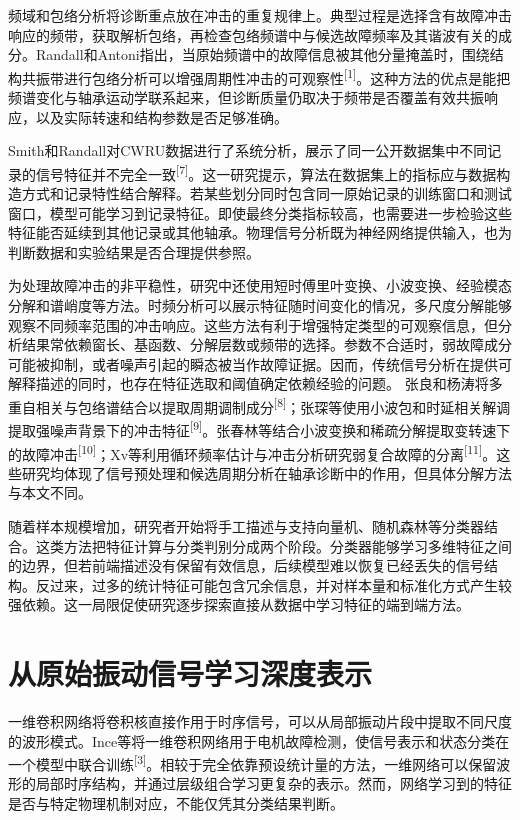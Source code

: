\documentclass[UTF8,12pt,openany,twoside]{ctexbook}
\numberwithin{equation}{chapter}
\begin{document}
频域和包络分析将诊断重点放在冲击的重复规律上。典型过程是选择含有故障冲击响应的频带，获取解析包络，再检查包络频谱中与候选故障频率及其谐波有关的成分。Randall和Antoni指出，当原始频谱中的故障信息被其他分量掩盖时，围绕结构共振带进行包络分析可以增强周期性冲击的可观察性\textsuperscript{[1]}。这种方法的优点是能把频谱变化与轴承运动学联系起来，但诊断质量仍取决于频带是否覆盖有效共振响应，以及实际转速和结构参数是否足够准确。

Smith和Randall对CWRU数据进行了系统分析，展示了同一公开数据集中不同记录的信号特征并不完全一致\textsuperscript{[7]}。这一研究提示，算法在数据集上的指标应与数据构造方式和记录特性结合解释。若某些划分同时包含同一原始记录的训练窗口和测试窗口，模型可能学习到记录特征。即使最终分类指标较高，也需要进一步检验这些特征能否延续到其他记录或其他轴承。物理信号分析既为神经网络提供输入，也为判断数据和实验结果是否合理提供参照。

为处理故障冲击的非平稳性，研究中还使用短时傅里叶变换、小波变换、经验模态分解和谱峭度等方法。时频分析可以展示特征随时间变化的情况，多尺度分解能够观察不同频率范围的冲击响应。这些方法有利于增强特定类型的可观察信息，但分析结果常依赖窗长、基函数、分解层数或频带的选择。参数不合适时，弱故障成分可能被抑制，或者噪声引起的瞬态被当作故障证据。因而，传统信号分析在提供可解释描述的同时，也存在特征选取和阈值确定依赖经验的问题。 张良和杨涛将多重自相关与包络谱结合以提取周期调制成分\textsuperscript{[8]}；张琛等使用小波包和时延相关解调提取强噪声背景下的冲击特征\textsuperscript{[9]}。张春林等结合小波变换和稀疏分解提取变转速下的故障冲击\textsuperscript{[10]}；Xv等利用循环频率估计与冲击分析研究弱复合故障的分离\textsuperscript{[11]}。这些研究均体现了信号预处理和候选周期分析在轴承诊断中的作用，但具体分解方法与本文不同。

随着样本规模增加，研究者开始将手工描述与支持向量机、随机森林等分类器结合。这类方法把特征计算与分类判别分成两个阶段。分类器能够学习多维特征之间的边界，但若前端描述没有保留有效信息，后续模型难以恢复已经丢失的信号结构。反过来，过多的统计特征可能包含冗余信息，并对样本量和标准化方式产生较强依赖。这一局限促使研究逐步探索直接从数据中学习特征的端到端方法。

\section{从原始振动信号学习深度表示}\label{ux4eceux539fux59cbux632fux52a8ux4fe1ux53f7ux5b66ux4e60ux6df1ux5ea6ux8868ux793a}

一维卷积网络将卷积核直接作用于时序信号，可以从局部振动片段中提取不同尺度的波形模式。Ince等将一维卷积网络用于电机故障检测，使信号表示和状态分类在一个模型中联合训练\textsuperscript{[3]}。相较于完全依靠预设统计量的方法，一维网络可以保留波形的局部时序结构，并通过层级组合学习更复杂的表示。然而，网络学习到的特征是否与特定物理机制对应，不能仅凭其分类结果判断。
\end{document}
